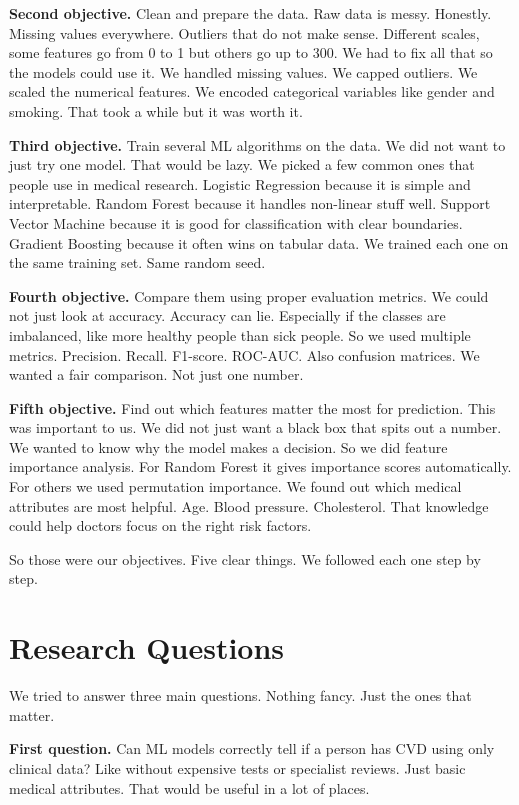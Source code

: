 \documentclass[12pt, a4paper, oneside]{book}
\begin{document}
\textbf{Second objective.} Clean and prepare the data. Raw data is messy. Honestly. Missing values everywhere. Outliers that do not make sense. Different scales, some features go from 0 to 1 but others go up to 300. We had to fix all that so the models could use it. We handled missing values. We capped outliers. We scaled the numerical features. We encoded categorical variables like gender and smoking. That took a while but it was worth it.

\textbf{Third objective.} Train several ML algorithms on the data. We did not want to just try one model. That would be lazy. We picked a few common ones that people use in medical research. Logistic Regression because it is simple and interpretable. Random Forest because it handles non-linear stuff well. Support Vector Machine because it is good for classification with clear boundaries. Gradient Boosting because it often wins on tabular data. We trained each one on the same training set. Same random seed.

\textbf{Fourth objective.} Compare them using proper evaluation metrics. We could not just look at accuracy. Accuracy can lie. Especially if the classes are imbalanced, like more healthy people than sick people. So we used multiple metrics. Precision. Recall. F1-score. ROC-AUC. Also confusion matrices. We wanted a fair comparison. Not just one number.

\textbf{Fifth objective.} Find out which features matter the most for prediction. This was important to us. We did not just want a black box that spits out a number. We wanted to know why the model makes a decision. So we did feature importance analysis. For Random Forest it gives importance scores automatically. For others we used permutation importance. We found out which medical attributes are most helpful. Age. Blood pressure. Cholesterol. That knowledge could help doctors focus on the right risk factors.

So those were our objectives. Five clear things. We followed each one step by step.

\section{Research Questions}
We tried to answer three main questions. Nothing fancy. Just the ones that matter.

\textbf{First question.} Can ML models correctly tell if a person has CVD using only clinical data? Like without expensive tests or specialist reviews. Just basic medical attributes. That would be useful in a lot of places.
\end{document}
